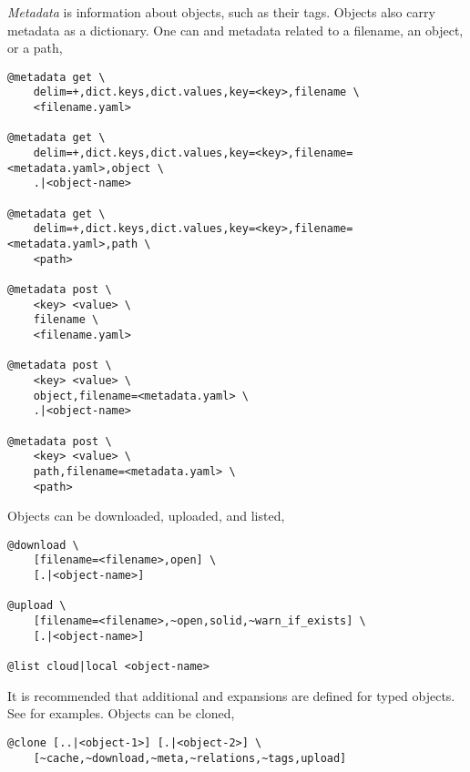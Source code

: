 \emph{Metadata} is information about objects, such as their tags. Objects also carry metadata as a dictionary. One can  and  metadata related to a filename, an object, or a path,
%
\begin{verbatim}
@metadata get \
    delim=+,dict.keys,dict.values,key=<key>,filename \
    <filename.yaml>
    
@metadata get \
    delim=+,dict.keys,dict.values,key=<key>,filename=<metadata.yaml>,object \
    .|<object-name>
    
@metadata get \
    delim=+,dict.keys,dict.values,key=<key>,filename=<metadata.yaml>,path \
    <path>
    
@metadata post \
    <key> <value> \
    filename \
    <filename.yaml>
    
@metadata post \
    <key> <value> \
    object,filename=<metadata.yaml> \
    .|<object-name>
    
@metadata post \
    <key> <value> \
    path,filename=<metadata.yaml> \
    <path>
\end{verbatim}

Objects can be downloaded, uploaded, and listed,
%
\begin{verbatim}
@download \
    [filename=<filename>,open] \
    [.|<object-name>]

@upload \
    [filename=<filename>,~open,solid,~warn_if_exists] \
    [.|<object-name>]
    
@list cloud|local <object-name>
\end{verbatim}
%
It is recommended that additional  and  expansions are defined for typed objects. See  for examples. Objects can be cloned,
%
\begin{verbatim}
@clone [..|<object-1>] [.|<object-2>] \
    [~cache,~download,~meta,~relations,~tags,upload]
\end{verbatim}